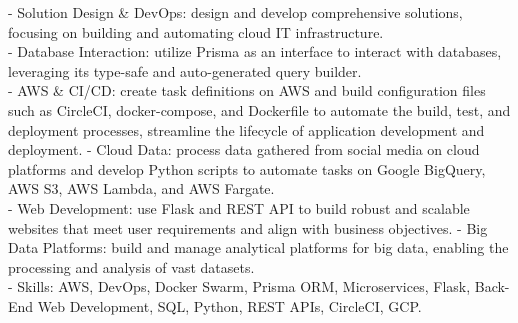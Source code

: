 \documentclass[
	a4paper,
]{fortysecondscv}
\begin{document}
\begin{cvtable}[3]
{    - Solution Design \& DevOps: design and develop comprehensive solutions, focusing on building and automating cloud IT infrastructure.\\
    - Database Interaction: utilize Prisma as an interface to interact with databases, leveraging its type-safe and auto-generated query builder.\\
    - AWS \& CI/CD: create task definitions on AWS and build configuration files such as CircleCI, docker-compose, and Dockerfile to automate the build, test, and deployment processes, streamline the lifecycle of application development and deployment.
    - Cloud Data: process data gathered from social media on cloud platforms and develop Python scripts to automate tasks on Google BigQuery, AWS S3, AWS Lambda, and AWS Fargate.\\
    - Web Development: use Flask and REST API to build robust and scalable websites that meet user requirements and align with business objectives.
    - Big Data Platforms: build and manage analytical platforms for big data, enabling the processing and analysis of vast datasets.\\
    - Skills: AWS, DevOps, Docker Swarm, Prisma ORM, Microservices, Flask, Back-End Web Development, SQL, Python, REST APIs, CircleCI, GCP.}
\end{cvtable}






\end{document}
